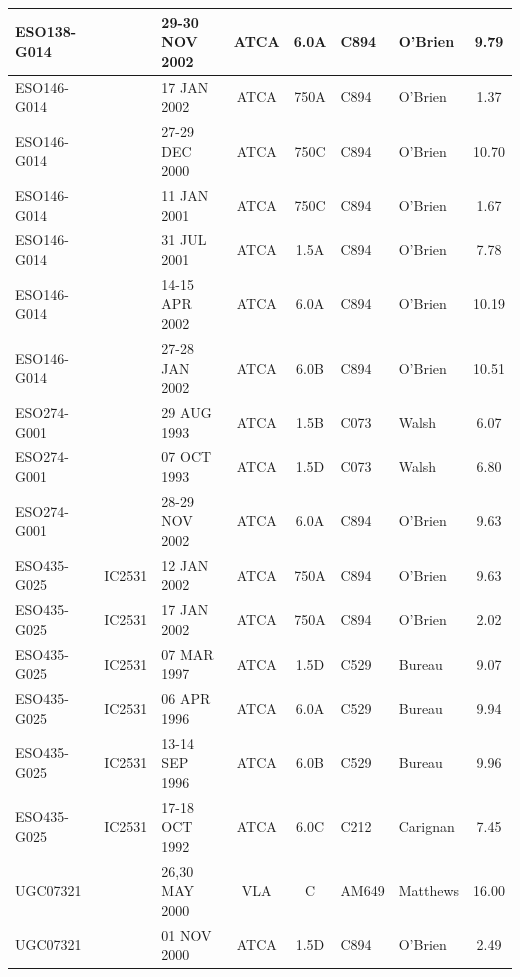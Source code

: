 \documentclass[traditabstract]{aa} %
\begin{document}
\begin{table}[t]
\begin{small}
\begin{tabular}{lllccllc}
ESO138-G014 &         & 29-30 NOV 2002 & ATCA & 6.0A  & C894    & O'Brien    &     9.79   \\
\hline
ESO146-G014 &         & 17 JAN 2002    & ATCA & 750A  & C894    & O'Brien    &     1.37   \\
ESO146-G014 &         & 27-29 DEC 2000 & ATCA & 750C  & C894    & O'Brien    &    10.70  \\
ESO146-G014 &         & 11 JAN 2001    & ATCA & 750C  & C894    & O'Brien    &     1.67  \\
ESO146-G014 &         & 31 JUL 2001    & ATCA & 1.5A  & C894    & O'Brien    &     7.78  \\
ESO146-G014 &         & 14-15 APR 2002 & ATCA & 6.0A  & C894    & O'Brien    &    10.19 \\
ESO146-G014 &         & 27-28 JAN 2002 & ATCA & 6.0B  & C894    & O'Brien    &    10.51  \\
\hline
ESO274-G001 &         & 29 AUG 1993    & ATCA & 1.5B  & C073    & Walsh      &     6.07  \\
ESO274-G001 &         & 07 OCT 1993    & ATCA & 1.5D  & C073    & Walsh      &     6.80   \\
ESO274-G001 &         & 28-29 NOV 2002 & ATCA & 6.0A  & C894    & O'Brien    &     9.63   \\
\hline
ESO435-G025 & IC2531  & 12 JAN 2002    & ATCA & 750A  & C894    & O'Brien    &     9.63  \\
ESO435-G025 & IC2531  & 17 JAN 2002    & ATCA & 750A  & C894    & O'Brien    &     2.02  \\
ESO435-G025 & IC2531  & 07 MAR 1997    & ATCA & 1.5D  & C529    & Bureau     &     9.07  \\
ESO435-G025 & IC2531  & 06 APR 1996    & ATCA & 6.0A  & C529    & Bureau     &     9.94  \\
ESO435-G025 & IC2531  & 13-14 SEP 1996 & ATCA & 6.0B  & C529    & Bureau     &     9.96 \\
ESO435-G025 & IC2531  & 17-18 OCT 1992 & ATCA & 6.0C  & C212    & Carignan   &     7.45 \\
\hline
UGC07321    &         & 26,30 MAY 2000 & VLA  & C     & AM649   & Matthews   &    16.00   \\
UGC07321    &         & 01 NOV 2000    & ATCA & 1.5D  & C894    & O'Brien    &     2.49  \\
\hline
\end{tabular}
\end{small}
\end{table}
\end{document}
